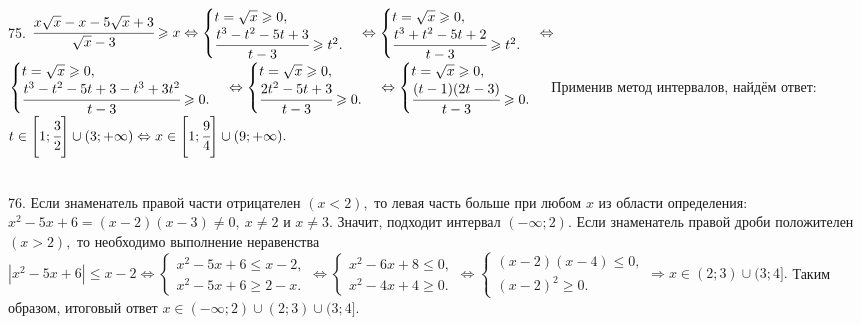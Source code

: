 \begin{figure}[ht!]
\end{figure}\\
75. $\cfrac{x\sqrt{x}-x-5\sqrt{x}+3}{\sqrt{x}-3}\geqslant x \Leftrightarrow \begin{cases} t=\sqrt{x}\geqslant0,\\ \cfrac{t^3-t^2-5t+3}{t-3}\geqslant t^2.\end{cases}
\Leftrightarrow \begin{cases} t=\sqrt{x}\geqslant0,\\ \cfrac{t^3+t^2-5t+2}{t-3}\geqslant t^2.\end{cases}
\Leftrightarrow$\\$ \begin{cases} t=\sqrt{x}\geqslant0,\\ \cfrac{t^3-t^2-5t+3-t^3+3t^2}{t-3}\geqslant 0.\end{cases}
\Leftrightarrow \begin{cases} t=\sqrt{x}\geqslant0,\\ \cfrac{2t^2-5t+3}{t-3}\geqslant 0.\end{cases}
\Leftrightarrow \begin{cases} t=\sqrt{x}\geqslant0,\\ \cfrac{(t-1)(2t-3)}{t-3}\geqslant 0.\end{cases}$ Применив метод интервалов, найдём ответ: $t\in\left[1;\cfrac{3}{2}\right]\cup(3;+\infty)\Leftrightarrow x \in\left[1;\cfrac{9}{4}\right]\cup(9;+\infty).$
\begin{figure}[ht!]
\end{figure}\\
76. Если знаменатель правой части отрицателен $(x<2),$ то левая часть больше при любом $x$ из области определения: $x^2-5x+6=(x-2)(x-3)\neq0,\ x\neq2$ и $x\neq3.$ Значит, подходит интервал $(-\infty;2).$ Если знаменатель правой дроби положителен $(x>2),$ то необходимо выполнение неравенства $|x^2-5x+6|\leqslant x-2\Leftrightarrow \begin{cases} x^2-5x+6\leqslant x-2,\\ x^2-5x+6\geqslant 2-x.\end{cases}\Leftrightarrow \begin{cases} x^2-6x+8\leqslant0,\\ x^2-4x+4\geqslant0.\end{cases}
\Leftrightarrow \begin{cases} (x-2)(x-4)\leqslant0,\\ (x-2)^2\geqslant0.\end{cases}\Rightarrow x\in(2;3)\cup(3;4].$ Таким образом, итоговый ответ $x\in(-\infty;2)\cup (2;3)\cup(3;4].$\newpage\noindent
